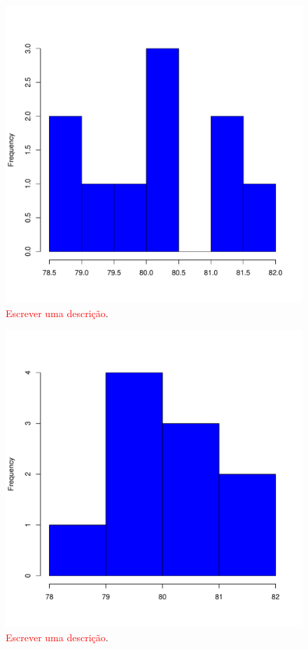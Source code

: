 \documentclass[conference]{IEEEtran}
\begin{document}
\begin{figure}[h]
	\centering
	\includegraphics[width=\linewidth]{img/bluehist_afsa_mfdr.pdf}
	\caption{\textcolor{red}{Escrever uma descrição}.}
	\label{fig:hist_afsa_mfdr}
\end{figure}

\begin{figure}[h]
	\centering
	\includegraphics[width=\linewidth]{img/bluehist_mfdr.pdf}
	\caption{\textcolor{red}{Escrever uma descrição}.}
	\label{fig:hist_mfdr}
\end{figure}
\end{document}
